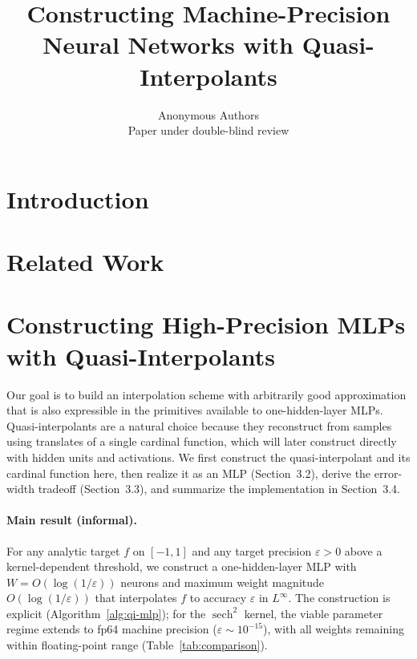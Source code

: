 \documentclass{article}
\title{Constructing Machine-Precision Neural Networks with Quasi-Interpolants}
\author{%
  Anonymous Authors \\
  Paper under double-blind review
}
\begin{document}
\maketitle

\begin{abstract}
\end{abstract}

\section{Introduction}

\section{Related Work}


\section{Constructing High-Precision MLPs with Quasi-Interpolants}
\label{sec:qi-construction}
Our goal is to build an interpolation scheme with arbitrarily good approximation that is also expressible in the primitives available to one-hidden-layer MLPs. Quasi-interpolants are a natural choice because they reconstruct from samples using translates of a single cardinal function, which will later construct directly with hidden units and activations. We first construct the quasi-interpolant and its cardinal function here, then realize it as an MLP (Section~3.2), derive the error-width tradeoff (Section~3.3), and summarize the implementation in Section~3.4.

\paragraph{Main result (informal).}
For any analytic target \(f\) on \([-1,1]\) and any target precision \(\varepsilon > 0\) above a kernel-dependent threshold, we construct a one-hidden-layer MLP with \(W = O(\log(1/\varepsilon))\) neurons and maximum weight magnitude \(O(\log(1/\varepsilon))\) that interpolates \(f\) to accuracy \(\varepsilon\) in \(L^\infty\). The construction is explicit (Algorithm~\ref{alg:qi-mlp}); for the \(\operatorname{sech}^2\) kernel, the viable parameter regime extends to fp64 machine precision (\(\varepsilon \sim 10^{-15}\)), with all weights remaining within floating-point range (Table~\ref{tab:comparison}).
\end{document}
